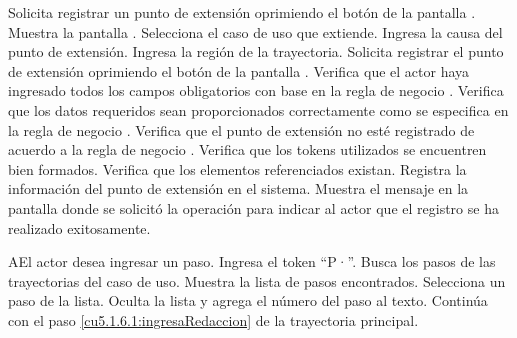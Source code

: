 
 \begin{UCtrayectoria}
	\UCpaso[\UCactor] Solicita registrar un punto de extensión oprimiendo el botón  de la pantalla . 
	\UCpaso[\UCsist] Muestra la pantalla . 
	\UCpaso[\UCactor] Selecciona el caso de uso que extiende. \label{cu5.1.6.1:ingresaDatos}
	\UCpaso[\UCactor] Ingresa la causa del punto de extensión.
	\UCpaso[\UCactor] Ingresa la región de la trayectoria. \label{cu5.1.6.1:ingresaRedaccion} 
	\UCpaso[\UCactor] Solicita registrar el punto de extensión oprimiendo el botón  de la pantalla .  
	\UCpaso[\UCsist] Verifica que el actor haya ingresado todos los campos obligatorios con base en la regla de negocio . 
	\UCpaso[\UCsist] Verifica que los datos requeridos sean proporcionados correctamente como se especifica en la regla de negocio .  
	\UCpaso[\UCsist] Verifica que el punto de extensión no esté registrado de acuerdo a la regla de negocio . 
	\UCpaso[\UCsist] Verifica que los tokens utilizados se encuentren bien formados. 
	\UCpaso[\UCsist] Verifica que los elementos referenciados existan. 
	\UCpaso[\UCsist] Registra la información del punto de extensión en el sistema.
	\UCpaso[\UCsist] Muestra el mensaje  en la pantalla donde se solicitó la operación
	para indicar al actor que el registro se ha realizado exitosamente. 
\end{UCtrayectoria}

 \begin{UCtrayectoriaA}{A}{El actor desea ingresar un paso.}
 	\UCpaso[\UCactor] Ingresa el token ``P·''.
  	\UCpaso[\UCsist] Busca los pasos de las trayectorias del caso de uso.
  	\UCpaso[\UCsist] Muestra la lista de pasos encontrados.
 	\UCpaso[\UCactor] Selecciona un paso de la lista.
  	\UCpaso[\UCsist] Oculta la lista y agrega el número del paso al texto.
    \UCpaso[] Continúa con el paso \ref{cu5.1.6.1:ingresaRedaccion} de la trayectoria principal.
 \end{UCtrayectoriaA}


